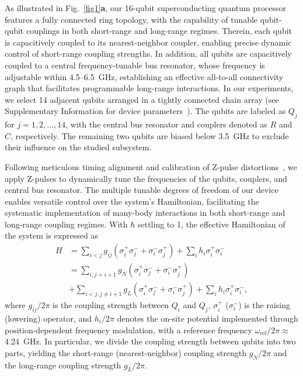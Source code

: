 \documentclass[reprint,superscriptaddress,preprintnumbers,longbibliography,
amsmath,amssymb,aps,floatfix,pra,twocolumn, tightenlines %
]{revtex4-2}
\begin{document}
	As illustrated in Fig.~\ref{fig1}\textbf{a}, our 16-qubit superconducting quantum processor features a fully connected ring topology, with the capability of tunable qubit-qubit couplings in both short-range and long-range regimes. Therein, each qubit is capacitively coupled to its nearest-neighbor coupler, enabling precise dynamic control of short-range coupling strengths. In addition, all qubits are capacitively coupled to a central frequency-tunable bus resonator, whose frequency is adjustable within 4.5--6.5~GHz, establishing an effective all-to-all connectivity graph that facilitates programmable long-range interactions. In our experiments, we select 14 adjacent qubits arranged in a tightly connected chain array (see Supplementary Information for device parameters~\cite{supp_cite}). The qubits are labeled as \( Q_j \) for \(j = 1, 2, \ldots, 14 \), with the central bus resonator and couplers denoted as \( R \) and \( C \), respectively. The remaining two qubits are biased below 3.5~GHz to exclude their influence on the studied subsystem. 
	
	Following meticulous timing alignment and calibration of Z-pulse distortions~\cite{supp_cite}, we apply Z-pulses to dynamically tune the frequencies of the qubits, couplers, and central bus resonator. The multiple tunable degrees of freedom of our device enables versatile control over the system’s Hamiltonian, facilitating the systematic implementation of many-body interactions in both short-range and long-range coupling regimes. With $\hbar$ settling to 1, the effective Hamiltonian of the system is expressed as~\cite{2021_PRL_guo}
    \begin{equation}\label{hamiltonian}
    \begin{aligned}
        H &= \sum_{i<j} g_{ij} (\sigma_i^+ \sigma_j^- + \sigma_i^- \sigma_j^+ ) + \sum_i h_i \sigma_i^+ \sigma_i^- \\
        &= \sum_{i,j=i+1} g_N (\sigma_i^+ \sigma_j^- + \sigma_i^- \sigma_j^+ ) \\
        &+ \sum_{i < j, j \neq i+1} g_L (\sigma_i^+ \sigma_j^- + \sigma_i^- \sigma_j^+)
        + \sum_i h_i \sigma_i^+ \sigma_i^-,
    \end{aligned} 
    \end{equation}
    where \(g_{ij}/2\pi\) is the coupling strength between \(Q_i\) and \(Q_j\), \(\sigma_i^+\) (\(\sigma_i^-\)) is the raising (lowering) operator, and \(h_{i}/2\pi\) denotes the on-site potential implemented through position-dependent frequency modulation, with a reference frequency \(\omega_{\mathrm{ref}}/2\pi \approx\) 4.24~GHz. In particular, we divide the coupling strength between qubits into two parts, yielding the short-range (nearest-neighbor) coupling strength \(g_N/2\pi\) and the long-range coupling strength \(g_L/2\pi\).  
    
\end{document}
